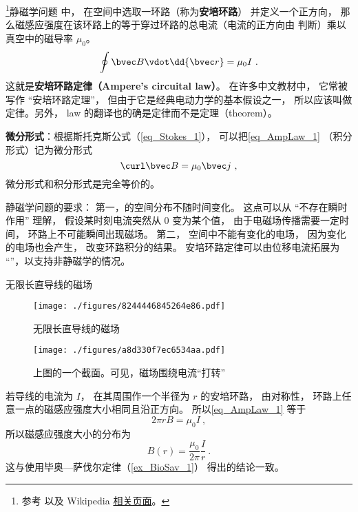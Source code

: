 

\footnote{参考 \cite{GriffE} 以及 Wikipedia \href{https://en.wikipedia.org/wiki/Amp\%C3\%A8re's_circuital_law}{相关页面}。}静磁学问题 %
中， 在空间中选取一环路（称为\textbf{安培环路}） 并定义一个正方向， 那么磁感应强度在该环路上的等于穿过环路的总电流（电流的正方向由 判断）乘以真空中的磁导率 $\mu_0$。
\begin{equation}\label{eq_AmpLaw_1}
\oint \bvec B \vdot \dd{\bvec r} = \mu_0 I~.
\end{equation}
这就是\textbf{安培环路定律（Ampere's circuital law）}。 在许多中文教材中， 它常被写作 “安培环路定理”， 但由于它是经典电动力学的基本假设之一， 所以应该叫做定律。另外， law 的翻译也的确是定律而不是定理（theorem）。

\textbf{微分形式}：根据斯托克斯公式（\autoref{eq_Stokes_1}）， 可以把\autoref{eq_AmpLaw_1} （积分形式）记为微分形式
\begin{equation}\label{eq_AmpLaw_2}
\curl \bvec B = \mu_0 \bvec j~,
\end{equation}
微分形式和积分形式是完全等价的。

静磁学问题的要求： 第一，的空间分布不随时间变化。 这点可以从 “不存在瞬时作用” 理解， 假设某时刻电流突然从 0 变为某个值， 由于电磁场传播需要一定时间， 环路上不可能瞬间出现磁场。 第二， 空间中不能有变化的电场， 因为变化的电场也会产生， 改变环路积分的结果。 安培环路定律可以由位移电流拓展为 “”，以支持非静磁学的情况。

\begin{example}{无限长直导线的磁场}\label{ex_AmpLaw_1}
\begin{figure}[ht]
\centering
\texttt{[image: ./figures/8244446845264e86.pdf]}
\caption{无限长直导线的磁场} \label{fig_AmpLaw_2}
\end{figure}

\begin{figure}[ht]
\centering
\texttt{[image: ./figures/a8d330f7ec6534aa.pdf]}
\caption{上图的一个截面。可见，磁场围绕电流“打转”} \label{fig_AmpLaw1}
\end{figure}

若导线的电流为 $I$， 在其周围作一个半径为 $r$ 的安培环路， 由对称性， 环路上任意一点的磁感应强度大小相同且沿正方向。 所以\autoref{eq_AmpLaw_1} 等于
\begin{equation}
2\pi r B = \mu_0 I~,
\end{equation}
所以磁感应强度大小的分布为
\begin{equation}
B(r) = \frac{\mu_0}{2\pi} \frac Ir~.
\end{equation}
这与使用毕奥—萨伐尔定律（\autoref{ex_BioSav_1}） 得出的结论一致。
\end{example}

